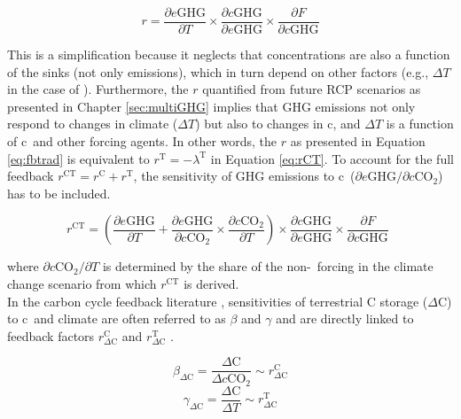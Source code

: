 \begin{equation}
\label{eq:fbtrad}
r = \frac{\partial e\text{GHG}}{\partial T} \times \frac{\partial c\text{GHG}}{\partial e\text{GHG}} \times \frac{\partial F}{\partial c\text{GHG}}
\end{equation}

This is a simplification because it neglects that concentrations are also a function of the sinks (not only emissions), which in turn depend on other factors (e.g., $\Delta T$ in the case of \chh ). Furthermore, the $r$ quantified from future RCP scenarios as presented in Chapter \ref{sec:multiGHG} implies that GHG emissions not only respond to changes in climate ($\Delta T$) but also to changes in c\coo , and $\Delta T$ is a function of c\coo\ and other forcing agents. In other words, the $r$ as presented in Equation \ref{eq:fbtrad} is equivalent to $r^{\text{T}}=-\lambda^{\text{T}}$ in Equation \ref{eq:rCT}. To account for the full feedback  $r^{\text{CT}}= r^{\text{C}}+r^{\text{T}}$, the sensitivity of GHG emissions to c\coo\ ($\partial e\text{GHG}/\partial c\text{CO}_2$) has to be included.

\begin{equation}
\label{eq:fbext}
r^{\text{CT}} = (\frac{\partial e\text{GHG}}{\partial T} + \frac{\partial e\text{GHG}}{\partial c\text{CO}_2} \times \frac{\partial c\text{CO}_2}{\partial T} )\times \frac{\partial c\text{GHG}}{\partial e\text{GHG}} \times \frac{\partial F}{\partial c\text{GHG}}\;\,
\end{equation}

where $\partial c\text{CO}_2/\partial T$ is determined by the share of the non-\coo\ forcing in the climate change scenario from which $r^{\text{CT}}$ is derived.\\

In the carbon cycle feedback literature \citep{friedlingstein06, gregory09jclim, arora13}, sensitivities of terrestrial C storage ($\Delta$C) to c\coo\ and climate are often referred to as $\beta$ and $\gamma$ and are directly linked to feedback factors $r_{\Delta\text{C}}^{\text{C}}$ and $r_{\Delta\text{C}}^{\text{T}}$ \citep{gregory09jclim}.

\begin{equation}
  \beta_{\Delta\text{C}}  = \frac{\Delta \text{C}}{\Delta c\text{CO}_2} \sim r_{\Delta\text{C}}^{\text{C}}
\end{equation}
\begin{equation}
  \gamma_{\Delta\text{C}} = \frac{\Delta \text{C}}{\Delta T}            \sim  r_{\Delta\text{C}}^{\text{T}}
\end{equation}

